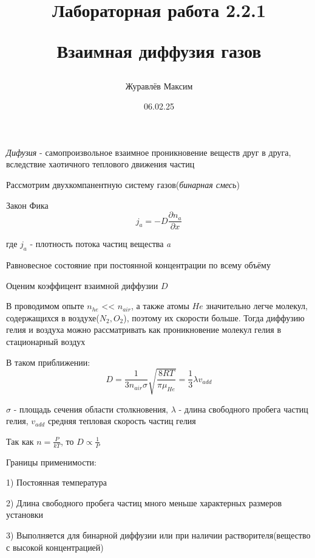 \documentclass{article}
\begin{document}
 \title{Лабораторная работа 2.2.1  \par \textbf{Взаимная диффузия газов}}
 \author{Журавлёв Максим}
 \date{06.02.25}
 \maketitle
 
 \pagebreak
 \large
 
 \textit{Дифузия} - самопроизвольное взаимное проникновение веществ друг в друга, вследствие хаотичного теплового движения частиц
 
 \vspace{20pt}
 Рассмотрим двухкомпанентную систему газов(\textit{бинарная смесь})
 \vspace{3pt}

 \huge{Закон Фика}
 \large\[j_a = - D \frac{\partial n_a}{\partial x}\]

 где $j_a$ - плотность потока частиц вещества \textit{a}

 \vspace{8pt}
 
 Равновесное состояние при постоянной концентрации по всему объёму
 
 \vspace{15pt}

 Оценим коэффицент взаимной диффузии $D$
 
 В проводимом опыте $n_{he}$  << $n_{air}$, а также атомы $He$ значительно легче молекул, содержащихся в воздухе($N_2, O_2$), поэтому их
 скорости больше. Тогда диффузию гелия и воздуха можно рассматривать как проникновение молекул гелия в стационарный воздух
 \par
 В таком приближении:
 \[D = \frac{1}{3{n_{air}}\sigma}\sqrt{\frac{8RT}{\pi\mu_{He}}} = \frac{1}{3}\lambda{v_{add}}\]

 $\sigma$ - площадь сечения области столкновения, $\lambda$ - длина свободного пробега частиц гелия, $v_{add}$ средняя тепловая скорость частиц гелия

 \vspace{2pt}

 Так как $n = \frac{P}{kT}$, то $D \propto \frac{1}{P}$ \vspace{3pt}

 Границы применимости:\par
 1) Постоянная температура \par
 2) Длина свободного пробега частиц много меньше характерных размеров установки \par
 3) Выполняется для бинарной диффузии или при наличии растворителя(вещество с высокой концентрацией)
\end{document}
